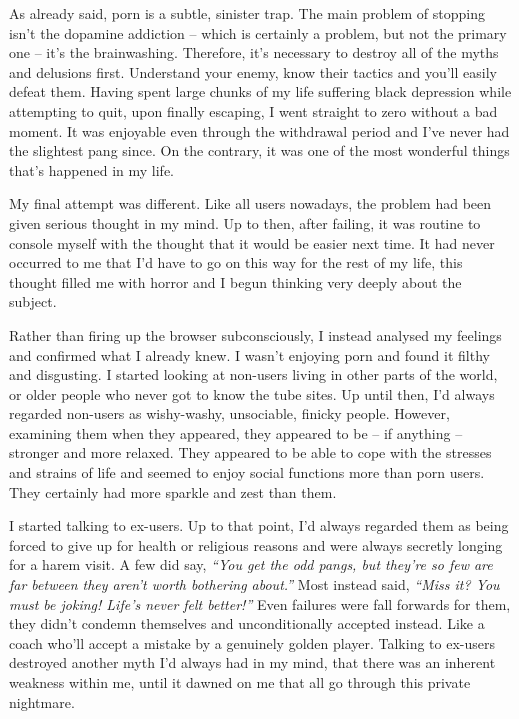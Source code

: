 \documentclass[
]{book}
\begin{document}
As already said, porn is a subtle, sinister trap. The main problem of stopping isn't the dopamine addiction -- which is certainly a problem, but not the primary one -- it's the brainwashing. Therefore, it's necessary to destroy all of the myths and delusions first. Understand your enemy, know their tactics and you'll easily defeat them. Having spent large chunks of my life suffering black depression while attempting to quit, upon finally escaping, I went straight to zero without a bad moment. It was enjoyable even through the withdrawal period and I've never had the slightest pang since. On the contrary, it was one of the most wonderful things that's happened in my life.

My final attempt was different. Like all users nowadays, the problem had been given serious thought in my mind. Up to then, after failing, it was routine to console myself with the thought that it would be easier next time. It had never occurred to me that I'd have to go on this way for the rest of my life, this thought filled me with horror and I begun thinking very deeply about the subject.

Rather than firing up the browser subconsciously, I instead analysed my feelings and confirmed what I already knew. I wasn't enjoying porn and found it filthy and disgusting. I started looking at non-users living in other parts of the world, or older people who never got to know the tube sites. Up until then, I'd always regarded non-users as wishy-washy, unsociable, finicky people. However, examining them when they appeared, they appeared to be -- if anything -- stronger and more relaxed. They appeared to be able to cope with the stresses and strains of life and seemed to enjoy social functions more than porn users. They certainly had more sparkle and zest than them.

I started talking to ex-users. Up to that point, I'd always regarded them as being forced to give up for health or religious reasons and were always secretly longing for a harem visit. A few did say, \emph{``You get the odd pangs, but they're so few are far between they aren't worth bothering about.''} Most instead said, \emph{``Miss it? You must be joking! Life's never felt better!''} Even failures were fall forwards for them, they didn't condemn themselves and unconditionally accepted instead. Like a coach who'll accept a mistake by a genuinely golden player. Talking to ex-users destroyed another myth I'd always had in my mind, that there was an inherent weakness within me, until it dawned on me that all go through this private nightmare.
\end{document}
